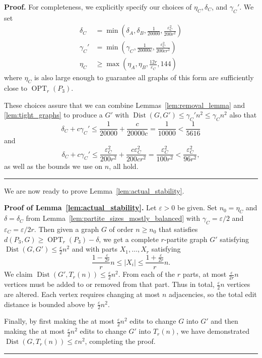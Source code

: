 \documentclass[12pt]{article}
\DeclareMathOperator{\OPT}{OPT}
\DeclareMathOperator{\Dist}{Dist}
\renewenvironment{proof}[1][Proof]{\textbf{#1.} }{\ \rule{0.5em}{0.5em}}
\begin{document}
\begin{proof}
For completeness, we explicitly specify our choices of $\eta_C, \delta_C$, and
$\gamma_C'$. We set
\begin{align*}
\delta_C &= \min\left(\delta_A, \delta_B, \frac{1}{20000},
\frac{\varepsilon_C^2}{200r^2}\right)\\
\gamma_C' &= \min\left(\gamma_C, \frac{1}{20000c},
\frac{\varepsilon_C^2}{200cr^2}\right)\\
\eta_C &\ge \max\left(\eta_A, \eta_B, \frac{12r}{\varepsilon_C}, 144\right)
\end{align*}
where $\eta_C$ is also large enough to guarantee all graphs of this form are
sufficiently close to $\OPT_r(P_3)$.

These choices assure that we can combine Lemmas~\ref{lem:removal_lemma} and \ref{lem:tight_graphs}
to produce a $G'$ with $\Dist(G,G') \le \gamma_C' n^2 \le \gamma_C n^2$ also
that
\[ \delta_C + c\gamma_C' \le \frac{1}{20000} + \frac{c}{20000c} =
\frac{1}{10000} < \frac{1}{5616} \]
and
\[ \delta_C + c\gamma_C' \le \frac{\varepsilon_C^2}{200r^2} +
\frac{c\varepsilon_C^2}{200cr^2} = \frac{\varepsilon_C^2}{100r^2} <
\frac{\varepsilon_C^2}{96r^2}, \]
as well as the bounds we use on $n$, all hold.
\end{proof}

We are now ready to prove Lemma~\ref{lem:actual_stability}.

\begin{proof}[Proof of Lemma~\ref{lem:actual_stability}]
Let $\varepsilon > 0$ be given. Set $n_0 = \eta_C$ and $\delta = \delta_C$ from
Lemma~\ref{lem:partite_sizes_mostly_balanced} with $\gamma_C = \varepsilon/2$
and $\varepsilon_C = \varepsilon/2r$. Then given a graph $G$ of order $n \ge
n_0$ that satisfies $d(P_3, G) \ge \OPT_r(P_3)-\delta$, we get a complete
$r$-partite graph $G'$ satisfying $\Dist(G,G') \le \frac{\varepsilon}{2}n^2$ and
with parts $X_1, \ldots, X_r$ satisfying
\[ \frac{1-\frac{\varepsilon}{2r}}{r}n \le |X_i| \le
\frac{1+\frac{\varepsilon}{2r}}{r}n. \]
We claim $\Dist(G',T_r(n)) \le \frac{\varepsilon}{2}n^2$. From each of the $r$
parts, at most $\frac{\varepsilon}{2r}n$ vertices must be added to or removed
from that part. Thus in total, $\frac{\varepsilon}{2}n$ vertices are altered.
Each vertex requires changing at most $n$ adjacencies, so the total edit
distance is bounded above by $\frac{\varepsilon}{2}n^2$.

Finally, by first making the at most $\frac{\varepsilon}{2}n^2$ edits to change
$G$ into $G'$ and then making the at most $\frac{\varepsilon}{2}n^2$ edits to
change $G'$ into $T_r(n)$, we have demonstrated $\Dist(G,T_r(n)) \le \varepsilon
n^2$, completing the proof.
\end{proof}
\end{document}
